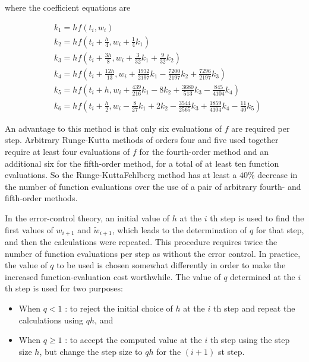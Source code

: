 where the coefficient equations are

$$
\begin{aligned}
& k_{1}=h f\left(t_{i}, w_{i}\right) \\
& k_{2}=h f\left(t_{i}+\frac{h}{4}, w_{i}+\frac{1}{4} k_{1}\right) \\
& k_{3}=h f\left(t_{i}+\frac{3 h}{8}, w_{i}+\frac{3}{32} k_{1}+\frac{9}{32} k_{2}\right) \\
& k_{4}=h f\left(t_{i}+\frac{12 h}{13}, w_{i}+\frac{1932}{2197} k_{1}-\frac{7200}{2197} k_{2}+\frac{7296}{2197} k_{3}\right) \\
& k_{5}=h f\left(t_{i}+h, w_{i}+\frac{439}{216} k_{1}-8 k_{2}+\frac{3680}{513} k_{3}-\frac{845}{4104} k_{4}\right) \\
& k_{6}=h f\left(t_{i}+\frac{h}{2}, w_{i}-\frac{8}{27} k_{1}+2 k_{2}-\frac{3544}{2565} k_{3}+\frac{1859}{4104} k_{4}-\frac{11}{40} k_{5}\right)
\end{aligned}
$$

An advantage to this method is that only six evaluations of $f$ are required per step. Arbitrary Runge-Kutta methods of orders four and five used together require at least four evaluations of $f$ for the fourth-order method and an additional six for the fifth-order method, for a total of at least ten function evaluations. So the Runge-KuttaFehlberg method has at least a $40 \%$ decrease in the number of function evaluations over the use of a pair of arbitrary fourth- and fifth-order methods.

In the error-control theory, an initial value of $h$ at the $i$ th step is used to find the first values of $w_{i+1}$ and $\tilde{w}_{i+1}$, which leads to the determination of $q$ for that step, and then the calculations were repeated. This procedure requires twice the number of function evaluations per step as without the error control. In practice, the value of $q$ to be used is chosen somewhat differently in order to make the increased function-evaluation cost worthwhile. The value of $q$ determined at the $i$ th step is used for two purposes:

\begin{itemize}
  \item When $q<1$ : to reject the initial choice of $h$ at the $i$ th step and repeat the calculations using $q h$, and
  \item When $q \geq 1$ : to accept the computed value at the $i$ th step using the step size $h$, but change the step size to $q h$ for the $(i+1)$ st step.
\end{itemize}

